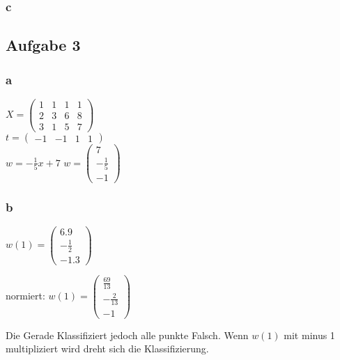 \documentclass{article}
\begin{document}
	\subsubsection{c}

\subsection{Aufgabe 3}
	\subsubsection{a}
 		$X= 
		\begin{pmatrix}
			1 & 1 & 1 & 1 \\
			2 & 3 & 6 & 8 \\
			3 & 1 & 5 & 7
		\end{pmatrix}$
		\\
		$t= \begin{pmatrix}
				-1 & -1 & 1 & 1
		\end{pmatrix}$
		\\
		$w = -\frac{1}{5}x + 7$
		$w = \begin{pmatrix}
			7\\
			-\frac{1}{5}\\
			-1
		\end{pmatrix}$
		
		\subsubsection{b}
		$w(1) = \begin{pmatrix}
			6.9 \\
			-\frac{1}{2}\\
			-1.3
		\end{pmatrix}$
		
		normiert: 
		$w(1) = \begin{pmatrix}
		\frac{69}{13} \\
		-\frac{2}{13}\\
		-1
		\end{pmatrix}$
		
		\begin{figure}[h]
		\end{figure}
		Die Gerade Klassifiziert jedoch alle punkte Falsch. Wenn $w(1)$ mit minus 1 multipliziert wird dreht sich die Klassifizierung.
		
\end{document}
